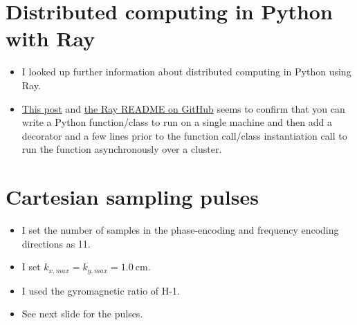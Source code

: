 \documentclass[dvipsnames]{beamer}
\begin{document}
\section{Distributed computing in Python with Ray}

\begin{frame}
\begin{itemize}
\item I looked up further information about distributed computing in Python using Ray.
\item \href{https://medium.com/formcept/scaling-python-modules-using-ray-framework-e5fc5430dc3e}{This post} and \href{https://github.com/ray-project/ray/blob/master/README.rst}{the Ray README on GitHub} seems to confirm that you can write a Python function/class to run on a single machine and then add a decorator and a few lines prior to the function call/class instantiation call to run the function asynchronously over a cluster.
\end{itemize}
\end{frame}

\section{Cartesian sampling pulses}

\begin{frame}
\begin{itemize}
\item I set the number of samples in the phase-encoding and frequency encoding directions as 11.
\item I set $k_{x, max} = k_{y,max} = 1.0~\mathrm{cm}$.
\item I used the gyromagnetic ratio of H-1.
\item See next slide for the pulses.
\end{itemize}
\end{frame}
\end{document}
